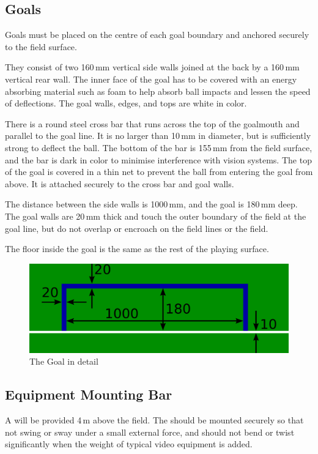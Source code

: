 \subsection{Goals}
Goals must be placed on the centre of each goal boundary and anchored
securely to the field surface.

They consist of two 160\,mm vertical side walls joined at the back by a 160\,mm
vertical rear wall. The inner face of the goal has to be covered with an energy
absorbing material such as foam to help absorb ball impacts and lessen the speed
of deflections.
The goal walls, edges, and tops are white in color.

There is a round steel cross bar that runs across the top of the goalmouth and
parallel to the goal line. It is no larger than 10\,mm in diameter, but is
sufficiently strong to deflect the ball. The bottom of the bar is 155\,mm from
the field surface, and the bar is dark in color to minimise interference with
vision systems. The top of the goal is covered in a thin net to prevent the ball
from entering the goal from above. It is attached securely to the cross bar and
goal walls.

The distance between the side walls is 1000\,mm, and the goal is 180\,mm deep.
The goal walls are 20\,mm thick and touch the outer boundary of the field at
the goal line, but do not overlap or encroach on the field lines or the field.

The floor inside the goal is the same as the rest of the playing surface.

\begin{figure}[ht] %
  \centering
  \includegraphics[width=0.5\columnwidth]{img/goal_detail.png}
  \caption{The Goal in detail}
  \label{fig:sslgoal}
\end{figure}

\subsection{Equipment Mounting Bar}

A  will be provided 4\,m
above the field.  The  should be mounted
securely so that  not swing or sway under a
small external force, and  should not bend or twist
significantly when the weight of typical video equipment is added.

